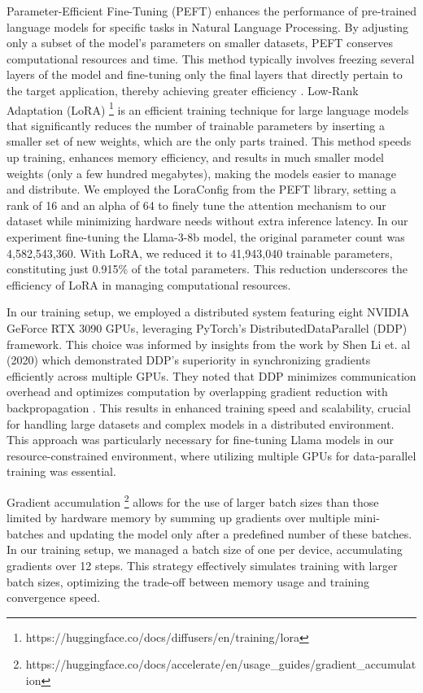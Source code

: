 \documentclass[logo,msc]{infthesis}           %
\begin{document}
Parameter-Efficient Fine-Tuning (PEFT) enhances the performance of pre-trained language models for specific tasks in Natural Language Processing. By adjusting only a subset of the model’s parameters on smaller datasets, PEFT conserves computational resources and time. This method typically involves freezing several layers of the model and fine-tuning only the final layers that directly pertain to the target application, thereby achieving greater efficiency \cite{j2024finetuningllmenterprise}. Low-Rank Adaptation (LoRA) \footnote{https://huggingface.co/docs/diffusers/en/training/lora} is an efficient training technique for large language models that significantly reduces the number of trainable parameters by inserting a smaller set of new weights, which are the only parts trained. This method speeds up training, enhances memory efficiency, and results in much smaller model weights (only a few hundred megabytes), making the models easier to manage and distribute. We employed the LoraConfig from the PEFT library, setting a rank of 16 and an alpha of 64 to finely tune the attention mechanism to our dataset while minimizing hardware needs without extra inference latency. In our experiment fine-tuning the Llama-3-8b model, the original parameter count was 4,582,543,360. With LoRA, we reduced it to 41,943,040 trainable parameters, constituting just 0.915\% of the total parameters. This reduction underscores the efficiency of LoRA in managing computational resources.


In our training setup, we employed a distributed system featuring eight NVIDIA GeForce RTX 3090 GPUs, leveraging PyTorch's DistributedDataParallel (DDP) framework. This choice was informed by insights from the work by Shen Li et. al (2020) which demonstrated DDP's superiority in synchronizing gradients efficiently across multiple GPUs. They noted that DDP minimizes communication overhead and optimizes computation by overlapping gradient reduction with backpropagation \cite{li2020pytorchdistributedexperiencesaccelerating}. This results in enhanced training speed and scalability, crucial for handling large datasets and complex models in a distributed environment. This approach was particularly necessary for fine-tuning Llama models in our resource-constrained environment, where utilizing multiple GPUs for data-parallel training was essential. 

Gradient accumulation \footnote{https://huggingface.co/docs/accelerate/en/usage_guides/gradient_accumulation} allows for the use of larger batch sizes than those limited by hardware memory by summing up gradients over multiple mini-batches and updating the model only after a predefined number of these batches. In our training setup, we managed a batch size of one per device, accumulating gradients over 12 steps. This strategy effectively simulates training with larger batch sizes, optimizing the trade-off between memory usage and training convergence speed.
\end{document}

